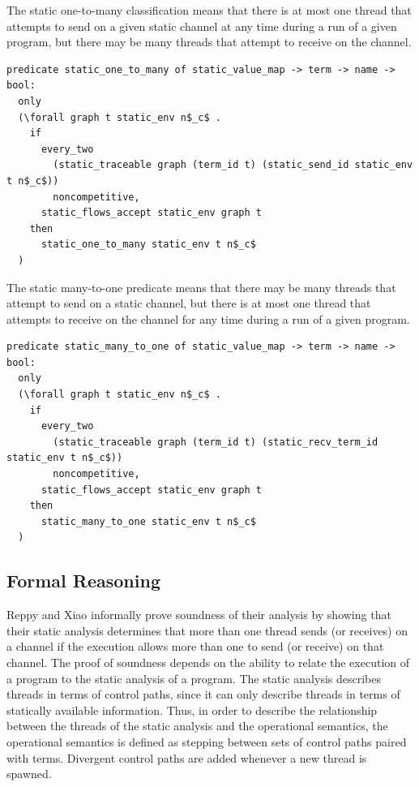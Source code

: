 \documentclass[10pt]{article}
\begin{document}
The static one-to-many classification means that there is at most one thread that attempts to
send on a given static channel at any time during a run of a given program, but there may be
many threads that attempt to receive on the channel.

\begin{lstlisting}[language=logic, mathescape]
  predicate static_one_to_many of static_value_map -> term -> name -> bool:
  only
  (\forall graph t static_env n$_c$ .
    if
      every_two
        (static_traceable graph (term_id t) (static_send_id static_env t n$_c$))
        noncompetitive,
      static_flows_accept static_env graph t 
    then
      static_one_to_many static_env t n$_c$
  ) 
\end{lstlisting}

The static many-to-one predicate means
that there may be many threads that attempt to send on a static channel, but there is at most
one thread that attempts to receive on the channel for any time during a run of a given
program.

\begin{lstlisting}[language=logic, mathescape]
  predicate static_many_to_one of static_value_map -> term -> name -> bool:
  only
  (\forall graph t static_env n$_c$ .
    if
      every_two
        (static_traceable graph (term_id t) (static_recv_term_id static_env t n$_c$))
        noncompetitive,
      static_flows_accept static_env graph t 
    then
      static_many_to_one static_env t n$_c$
  ) 
\end{lstlisting}

\subsection{Formal Reasoning}

Reppy and Xiao informally prove soundness of their analysis by showing that their static analysis
determines that more than one thread sends (or receives) on a channel if the execution allows more
than one to send (or receive) on that channel. The proof of soundness depends on the
ability to relate the execution of a program to the static analysis of a program. The static
analysis describes threads in terms of control paths, since it can only describe threads in
terms of statically available information. Thus, in order to describe the relationship between
the threads of the static analysis and the operational semantics, the operational semantics is
defined as stepping between sets of control paths paired with terms. Divergent control paths
are added whenever a new thread is spawned.
\end{document}
